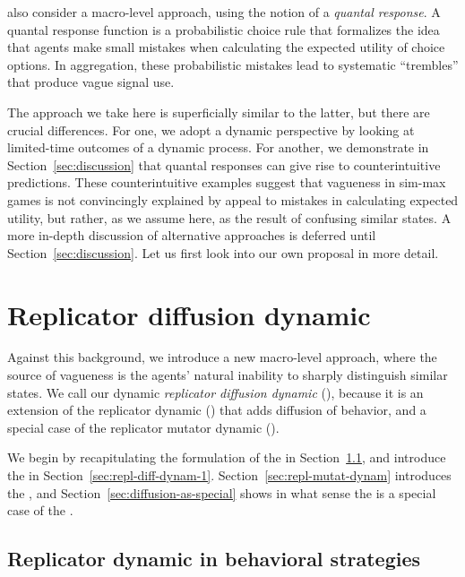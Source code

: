 \documentclass[fleqn,reqno,10pt]{article}
\newcommand{\rd}{\acro{rd}} %
\newcommand{\rmd}{\acro{rmd}} %
\newcommand{\rdd}{\acro{rdd}} %
\begin{document}
\citet{FrankeJager2010:Vagueness-Signa} also consider a macro-level
approach, using the notion of a \emph{quantal response}. A quantal
response function is a probabilistic choice rule that formalizes the
idea that agents make small mistakes when calculating the expected
utility of choice options. In aggregation, these probabilistic
mistakes lead to systematic ``trembles'' that produce vague signal
use.

The approach we take here is superficially similar to the latter, but
there are crucial differences. For one, we adopt a dynamic perspective
by looking at limited-time outcomes of a dynamic process. For another,
we demonstrate in Section~\ref{sec:discussion} that quantal responses
can give rise to counterintuitive predictions. These counterintuitive
examples suggest that vagueness in sim-max games is not convincingly
explained by appeal to mistakes in calculating expected utility, but
rather, as we assume here, as the result of confusing similar
states. A more in-depth discussion of alternative approaches is
deferred until Section~\ref{sec:discussion}.  Let us first look into
our own proposal in more detail.



\section{Replicator diffusion dynamic}
\label{sec:repl-diff-dynam}

Against this background, we introduce a new macro-level approach,
where the source of vagueness is the agents' natural inability to
sharply distinguish similar states. We call our dynamic
\emph{replicator diffusion dynamic} (\rdd), because it is an extension
of the replicator dynamic (\rd) that adds diffusion of behavior, and a
special case of the replicator mutator dynamic (\rmd).

We begin by recapitulating the formulation of the \rd in
Section~\ref{sec:repl-dynam-behav}, and introduce the \rdd in Section~\ref{sec:repl-diff-dynam-1}.
Section~\ref{sec:repl-mutat-dynam} introduces the \rmd, and
Section~\ref{sec:diffusion-as-special} shows in what sense the \rdd is
a special case of the \rmd.

\subsection{Replicator dynamic in behavioral strategies}
\label{sec:repl-dynam-behav}
\end{document}
